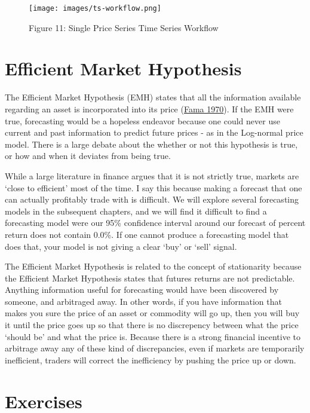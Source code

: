 \documentclass[
]{book}
\begin{document}
\begin{figure}
\centering
\texttt{[image: images/ts-workflow.png]}
\caption{Figure 11: Single Price Series Time Series Workflow}
\end{figure}

\hypertarget{efficient-market-hypothesis}{%
\section{Efficient Market Hypothesis}\label{efficient-market-hypothesis}}

The Efficient Market Hypothesis (EMH) states that all the information available regarding an asset is incorporated into its price (\protect\hyperlink{ref-fama1970efficient}{Fama 1970}). If the EMH were true, forecasting would be a hopeless endeavor because one could never use current and past information to predict future prices - as in the Log-normal price model. There is a large debate about the whether or not this hypothesis is true, or how and when it deviates from being true.

While a large literature in finance argues that it is not strictly true, markets are `close to efficient' most of the time. I say this because making a forecast that one can actually profitably trade with is difficult. We will explore several forecasting models in the subsequent chapters, and we will find it difficult to find a forecasting model were our 95\% confidence interval around our forecast of percent return does not contain 0.0\%. If one cannot produce a forecasting model that does that, your model is not giving a clear `buy' or `sell' signal.

The Efficient Market Hypothesis is related to the concept of stationarity because the Efficient Market Hypothesis states that futures returns are not predictable. Anything information useful for forecasting would have been discovered by someone, and arbitraged away. In other words, if you have information that makes you sure the price of an asset or commodity will go up, then you will buy it until the price goes up so that there is no discrepency between what the price `should be' and what the price is. Because there is a strong financial incentive to arbitrage away any of these kind of discrepancies, even if markets are temporarily inefficient, traders will correct the inefficiency by pushing the price up or down.

\hypertarget{exercises-12}{%
\section{Exercises}\label{exercises-12}}
\end{document}
